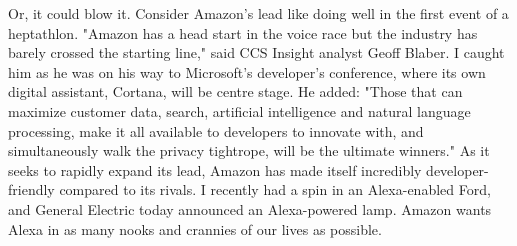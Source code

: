 Or, it could blow it. Consider Amazon's lead like doing well in the first event of a heptathlon.
"Amazon has a head start in the voice race but the industry has barely crossed the starting line," said CCS Insight analyst Geoff Blaber. I caught him as he was on his way to Microsoft's developer's conference, where its own digital assistant, Cortana, will be centre stage.
He added: "Those that can maximize customer data, search, artificial intelligence and natural language processing, make it all available to developers to innovate with, and simultaneously walk the privacy tightrope, will be the ultimate winners."
As it seeks to rapidly expand its lead, Amazon has made itself incredibly developer-friendly compared to its rivals. I recently had a spin in an Alexa-enabled Ford, and General Electric today announced an Alexa-powered lamp. Amazon wants Alexa in as many nooks and crannies of our lives as possible.

